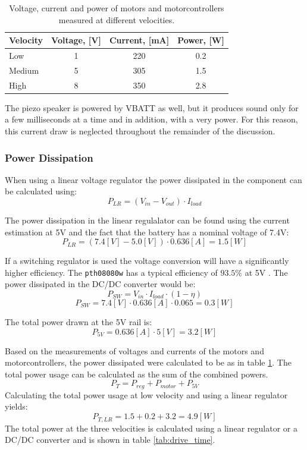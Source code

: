 \begin{table}[h]
\centering
\caption{Voltage, current and power of motors and motorcontrollers measured at different velocities.}
\label{tab:motor_power}
\begin{tabular}{|l|c|c|c|}
\hline
\textbf{Velocity} & Voltage, [V]   & Current, [mA] & Power, [W]      \\ \hline
Low     	& 1  & 220 & 0.2 \\ \hline
Medium 		& 5  & 305 & 1.5 \\ \hline
High        & 8  & 350 & 2.8 \\ \hline
\end{tabular}
\end{table}

The piezo speaker is powered by VBATT as well, but it produces sound only for a few milliseconds at a time and in addition, with a very power.
For this reason, this current draw is neglected throughout the remainder of the discussion.

\subsubsection*{Power Dissipation} %
\label{sec:power_dissipation}
When using a linear voltage regulator the power dissipated in the component can be calculated using:
$$P_{LR} = (V_{in} - V_{out}) \cdot I_{load}$$

The power dissipation in the linear regulalator can be found using the current estimation at 5V and the fact that the battery has a nominal voltage of 7.4V:
$$P_{LR} = (7.4 [V] - 5.0 [V]) \cdot 0.636 [A] = 1.5 [W]$$

If a switching regulator is used the voltage conversion will have a significantly higher efficiency.
The \texttt{pth08080w} has a typical efficiency of $93.5\%$ at 5V \cite{pth08080}.
The power dissipated in the DC/DC converter would be:
$$P_{SW} = V_{in} \cdot I_{load} \cdot (1 - \eta) $$
$$P_{SW} = 7.4 [V] \cdot 0.636 [A] \cdot 0.065 = 0.3 [W]$$


The total power drawn at the 5V rail is:
$$P_{5V} = 0.636 [A] \cdot 5 [V] = 3.2 [W]$$

Based on the measurements of voltages and currents of the motors and motorcontrollers, the power dissipated were calculated to be as in table \ref{tab:motor_power}.
The total power usage can be calculated as the sum of the combined powers.
$$P_{T} = P_{reg} + P_{motor} + P_{5V}$$ 
Calculating the total power usage at low velocity and using a linear regulator yields:
$$P_{T,LR} = 1.5 + 0.2 + 3.2 = 4.9 [W]$$ 
The total power at the three velocities is calculated using a linear regulator or a DC/DC converter and is shown in table \ref{tab:drive_time}. 

